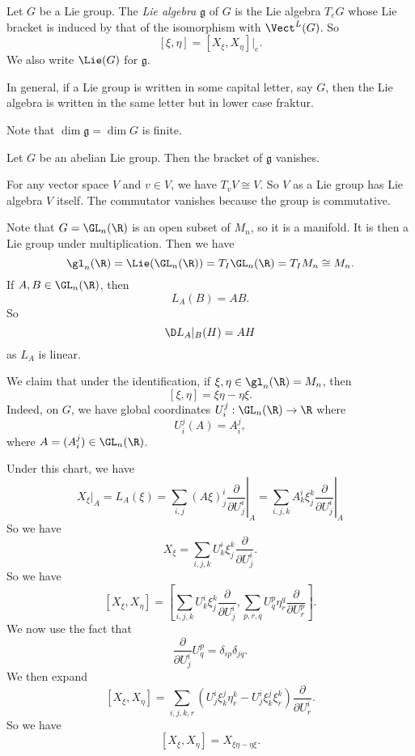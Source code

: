 \documentclass[a4paper]{article}
\begin{document}
\begin{defi}
  Let $G$ be a Lie group. The \emph{Lie algebra} $\mathfrak{g}$ of $G$ is the Lie algebra $T_eG$ whose Lie bracket is induced by that of the isomorphism with $\Vect^L(G)$. So
  \[
    [\xi, \eta] = [X_\xi, X_\eta]|_e.
  \]
  We also write $\Lie(G)$ for $\mathfrak{g}$.
\end{defi}
In general, if a Lie group is written in some capital letter, say $G$, then the Lie algebra is written in the same letter but in lower case fraktur.

Note that $\dim \mathfrak{g} = \dim G$ is finite.

\begin{lemma}
  Let $G$ be an abelian Lie group. Then the bracket of $\mathfrak{g}$ vanishes.
\end{lemma}

\begin{eg}
  For any vector space $V$ and $v \in V$, we have $T_v V \cong V$. So $V$ as a Lie group has Lie algebra $V$ itself. The commutator vanishes because the group is commutative.
\end{eg}

\begin{eg}
  Note that $G = \GL_n(\R)$ is an open subset of $M_n$, so it is a manifold. It is then a Lie group under multiplication. Then we have
  \[
    \gl_n(\R) = \Lie(\GL_n(\R)) = T_I \GL_n(\R) = T_I M_n \cong M_n.
  \]
  If $A, B \in \GL_n(\R)$, then
  \[
    L_A(B) = AB.
  \]
  So
  \[
    \D L_A|_B(H) = AH
  \]
  as $L_A$ is linear.

  We claim that under the identification, if $\xi, \eta \in \gl_n(\R) = M_n$, then
  \[
    [\xi, \eta] = \xi \eta - \eta \xi.
  \]
  Indeed, on $G$, we have global coordinates $U_i^j: \GL_n(\R) \to \R$ where
  \[
    U_i^j(A) = A_i^j,
  \]
  where $A = (A_i^j) \in \GL_n(\R)$.

  Under this chart, we have
  \[
    X_\xi|_A = L_A(\xi) = \sum_{i,j} (A \xi)_j^i \left.\frac{\partial}{\partial U_j^i}\right|_A = \sum_{i,j,k} A_k^i \xi_j^k \left.\frac{\partial}{\partial U_j^i} \right|_A
  \]
  So we have
  \[
    X_\xi = \sum_{i,j,k} U^i_k \xi^k_j \frac{\partial}{\partial U_j^i}.
  \]
  So we have
  \[
    [X_\xi, X_\eta] = \left[\sum_{i,j,k} U_k^i \xi_j^k \frac{\partial}{\partial U_j^i},\sum_{p, r, q} U_q^p \eta_r^q \frac{\partial}{\partial U_r^p}\right].
  \]
  We now use the fact that
  \[
    \frac{\partial}{\partial U^i_j} U^p_q = \delta_{ip}\delta_{jq}.
  \]
  We then expand
  \[
    [X_\xi, X_\eta] = \sum_{i,j,k,r} (U_j^i \xi_k^j \eta^k_r - U^i_j \xi^j_k \xi^k_r) \frac{\partial}{\partial U_r^i}.
  \]
  So we have
  \[
    [X_\xi, X_\eta] = X_{\xi\eta - \eta\xi}.
  \]
\end{eg}
\end{document}
